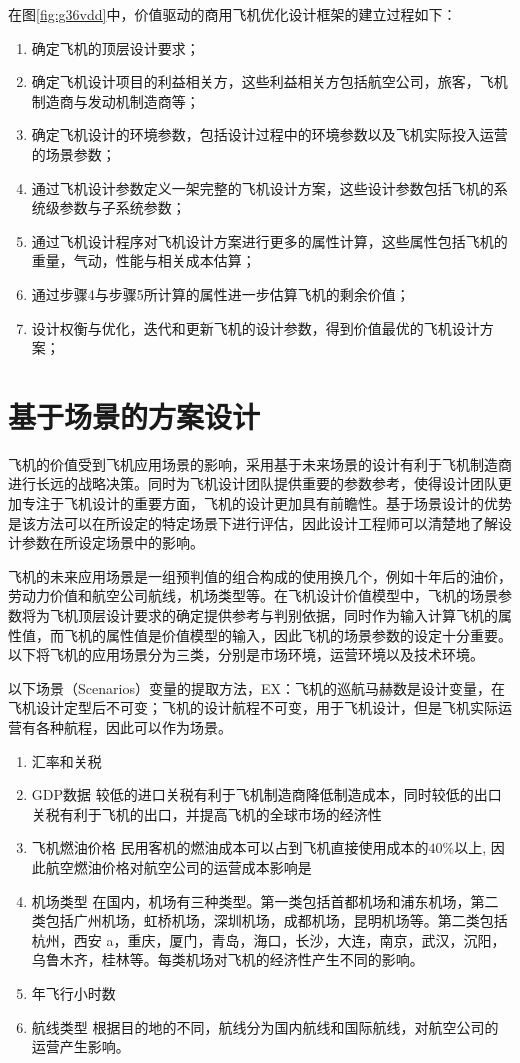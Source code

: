 \documentclass[12pt,a4paper]{report}
\begin{document}
在图\ref{fig:g36vdd}中，价值驱动的商用飞机优化设计框架的建立过程如下：
\begin{enumerate}
	\item 确定飞机的顶层设计要求；
	\item 确定飞机设计项目的利益相关方，这些利益相关方包括航空公司，旅客，飞机制造商与发动机制造商等；
	\item 确定飞机设计的环境参数，包括设计过程中的环境参数以及飞机实际投入运营的场景参数；
	\item 通过飞机设计参数定义一架完整的飞机设计方案，这些设计参数包括飞机的系统级参数与子系统参数；
	\item 通过飞机设计程序对飞机设计方案进行更多的属性计算，这些属性包括飞机的重量，气动，性能与相关成本估算；
	\item 通过步骤4与步骤5所计算的属性进一步估算飞机的剩余价值；
	\item 设计权衡与优化，迭代和更新飞机的设计参数，得到价值最优的飞机设计方案；
\end{enumerate}

\section{基于场景的方案设计}
飞机的价值受到飞机应用场景的影响，采用基于未来场景的设计有利于飞机制造商进行长远的战略决策。同时为飞机设计团队提供重要的参数参考，使得设计团队更加专注于飞机设计的重要方面，飞机的设计更加具有前瞻性。基于场景设计的优势是该方法可以在所设定的特定场景下进行评估，因此设计工程师可以清楚地了解设计参数在所设定场景中的影响。

飞机的未来应用场景是一组预判值的组合构成的使用换几个，例如十年后的油价，劳动力价值和航空公司航线，机场类型等。在飞机设计价值模型中，飞机的场景参数将为飞机顶层设计要求的确定提供参考与判别依据，同时作为输入计算飞机的属性值，而飞机的属性值是价值模型的输入，因此飞机的场景参数的设定十分重要。以下将飞机的应用场景分为三类，分别是市场环境，运营环境以及技术环境。

以下场景（Scenarios）变量的提取方法，EX：飞机的巡航马赫数是设计变量，在飞机设计定型后不可变；飞机的设计航程不可变，用于飞机设计，但是飞机实际运营有各种航程，因此可以作为场景。

\begin{enumerate}
\item 汇率和关税
\item GDP数据
较低的进口关税有利于飞机制造商降低制造成本，同时较低的出口关税有利于飞机的出口，并提高飞机的全球市场的经济性
\item 飞机燃油价格
民用客机的燃油成本可以占到飞机直接使用成本的$40\%$以上, 因此航空燃油价格对航空公司的运营成本影响是
\item 机场类型
在国内，机场有三种类型。第一类包括首都机场和浦东机场，第二类包括广州机场，虹桥机场，深圳机场，成都机场，昆明机场等。第二类包括杭州，西安 a，重庆，厦门，青岛，海口，长沙，大连，南京，武汉，沉阳，乌鲁木齐，桂林等。每类机场对飞机的经济性产生不同的影响。
\item 年飞行小时数
\item 航线类型 \textemdash 根据目的地的不同，航线分为国内航线和国际航线，对航空公司的运营产生影响。
\end{enumerate}
\end{document}
